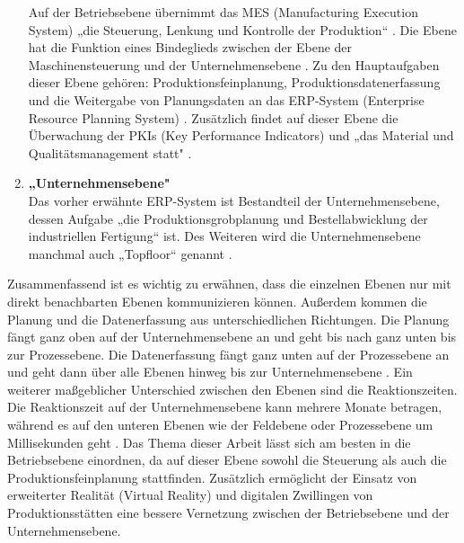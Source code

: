 \begin{enumerate}
	Auf der Betriebsebene übernimmt das MES (Manufacturing Execution System) „die Steuerung, Lenkung und Kontrolle der Produktion“ \cite[S.50]{14}. Die Ebene hat die Funktion eines Bindeglieds zwischen der Ebene der Maschinensteuerung und der Unternehmensebene \cite[S.50]{14}. Zu den Hauptaufgaben dieser Ebene gehören: Produktionsfeinplanung, Produktionsdatenerfassung und die Weitergabe von Planungsdaten an das ERP-System (Enterprise Resource Planning System) \cite[S.50]{14}.  Zusätzlich findet auf dieser Ebene die Überwachung der PKIs (Key Performance Indicators) und „das Material und Qualitätsmanagement statt" \cite[S.405]{15}.
	\item \textbf{„Unternehmensebene"} \cite[S.50]{14} \\
	Das vorher erwähnte ERP-System ist Bestandteil der Unternehmensebene, dessen Aufgabe „die Produktionsgrobplanung und Bestellabwicklung der industriellen Fertigung“ \cite[S.50]{14} ist. Des Weiteren wird die Unternehmensebene manchmal auch „Topfloor“ genannt \cite[S.50]{14}.
\end{enumerate}
Zusammenfassend ist es wichtig zu erwähnen, dass die einzelnen Ebenen nur mit direkt benachbarten Ebenen kommunizieren können. Außerdem kommen die Planung und die Datenerfassung aus unterschiedlichen Richtungen. Die Planung fängt ganz oben auf der Unternehmensebene an und geht bis nach ganz unten bis zur Prozessebene. Die Datenerfassung fängt ganz unten auf der Prozessebene an und geht dann über alle Ebenen hinweg bis zur Unternehmensebene \cite[S.50]{14}. Ein weiterer maßgeblicher Unterschied zwischen den Ebenen sind die Reaktionszeiten. Die Reaktionszeit auf der Unternehmensebene kann mehrere Monate betragen, während es auf den unteren Ebenen wie der Feldebene oder Prozessebene um Millisekunden geht \cite[S.123]{16}.
\newline\newline
Das Thema dieser Arbeit lässt sich am besten in die Betriebsebene einordnen, da auf dieser Ebene sowohl die Steuerung als auch die Produktionsfeinplanung stattfinden. Zusätzlich ermöglicht der Einsatz von erweiterter Realität (Virtual Reality) und digitalen Zwillingen von Produktionsstätten eine bessere Vernetzung zwischen der Betriebsebene und der Unternehmensebene.

